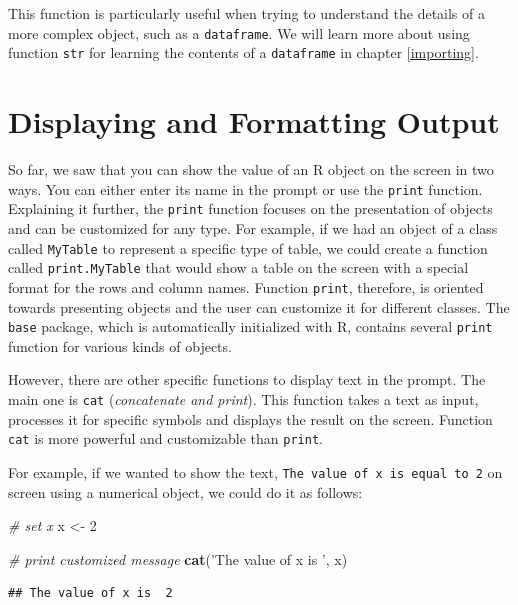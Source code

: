\documentclass[11pt,]{book}
\newenvironment{Shaded}{\begin{snugshade}}{\end{snugshade}}
\newcommand{\KeywordTok}[1]{\textcolor[rgb]{0.27,0.27,0.27}{\textbf{#1}}}
\newcommand{\DecValTok}[1]{\textcolor[rgb]{0.06,0.06,0.06}{#1}}
\newcommand{\StringTok}[1]{\textcolor[rgb]{0.5,0.5,0.5}{#1}}
\newcommand{\CommentTok}[1]{\textcolor[rgb]{0.56,0.35,0.01}{\textit{#1}}}
\newcommand{\NormalTok}[1]{#1}
\begin{document}
This function is particularly useful when trying to understand the
details of a more complex object, such as a \texttt{dataframe}. We will
learn more about using function \texttt{str} for learning the contents
of a \texttt{dataframe} in chapter \ref{importing}.

\section{Displaying and Formatting
Output}\label{displaying-and-formatting-output}

So far, we saw that you can show the value of an R object on the screen
in two ways. You can either enter its name in the prompt or use the
\texttt{print} function. Explaining it further, the \texttt{print}
function focuses on the presentation of objects and can be customized
for any type. For example, if we had an object of a class called
\texttt{MyTable} to represent a specific type of table, we could create
a function called \texttt{print.MyTable} that would show a table on the
screen with a special format for the rows and column names. Function
\texttt{print}, therefore, is oriented towards presenting objects and
the user can customize it for different classes. The \texttt{base}
package, which is automatically initialized with R, contains several
\texttt{print} function for various kinds of objects.

However, there are other specific functions to display text in the
prompt. The main one is \texttt{cat} (\emph{concatenate and print}).
This function takes a text as input, processes it for specific symbols
and displays the result on the screen. Function \texttt{cat} is more
powerful and customizable than \texttt{print}. 

For example, if we wanted to show the text,
\texttt{The\ value\ of\ x\ is\ equal\ to\ 2} on screen using a numerical
object, we could do it as follows:

\begin{Shaded}
\begin{Highlighting}[]
\CommentTok{# set x}
\NormalTok{x <-}\StringTok{ }\DecValTok{2}

\CommentTok{# print customized message}
\KeywordTok{cat}\NormalTok{(}\StringTok{'The value of x is '}\NormalTok{, x)}
\end{Highlighting}
\end{Shaded}

\begin{verbatim}
## The value of x is  2
\end{verbatim}
\end{document}
